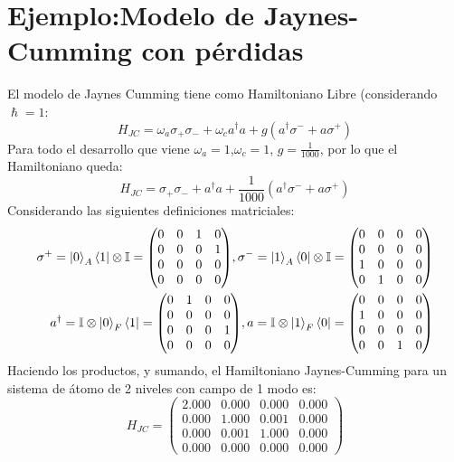 \documentclass{book}
\begin{document}
\section{Ejemplo:Modelo de Jaynes-Cumming con pérdidas}
El modelo de Jaynes Cumming tiene como Hamiltoniano Libre (considerando ${\hslash=1}$:
\begin{equation}{H_{JC}=\omega_a \sigma_+\sigma_-+\omega_c a^\dag a +g(a^\dag\sigma^-+a\sigma^+)}\end{equation} 
Para todo el desarrollo que viene $ {\omega_a=1}$,$ {\omega_c=1}$, $ {g=\frac{1}{1000}}$, por lo que el Hamiltoniano queda: 
\begin{equation}{H_{JC}=\sigma_+\sigma_-+a^\dag a +\frac{1}{1000}(a^\dag\sigma^-+a\sigma^+)}\end{equation} 
Considerando las siguientes definiciones matriciales:
\begin{equation}\begin{aligned}{\sigma^+=\ket{0}_A\bra{1}\otimes\mathbb{I}=\begin{pmatrix} 0&0&1&0 \\ 0&0&0&1 \\ 0&0&0&0 \\ 0&0&0&0 \end{pmatrix}}, {\sigma^-=\ket{1}_A\bra{0}\otimes\mathbb{I}=\begin{pmatrix} 0&0&0&0 \\ 0&0&0&0 \\ 1&0&0&0 \\ 0&1&0&0 \end{pmatrix}}\\ {a^\dag=\mathbb{I}\otimes\ket{0}_F\bra{1}=\begin{pmatrix} 0&1&0&0 \\ 0&0&0&0 \\ 0&0&0&1 \\ 0&0&0&0 \end{pmatrix}}, {a=\mathbb{I}\otimes\ket{1}_F\bra{0}=\begin{pmatrix} 0&0&0&0 \\ 1&0&0&0 \\ 0&0&0&0 \\ 0&0&1&0 \end{pmatrix}}\end{aligned}\end{equation}
Haciendo los productos, y sumando, el Hamiltoniano Jaynes-Cumming para un sistema de átomo de 2 niveles con campo de 1 modo es:
\begin{equation}{H_{JC}=\begin{pmatrix} 2.000 & 0.000 & 0.000 & 0.000 \\ 0.000 & 1.000 & 0.001 & 0.000 \\ 0.000 & 0.001 & 1.000 & 0.000 \\ 0.000 & 0.000 & 0.000  & 0.000\end{pmatrix}}\end{equation}
\end{document}
